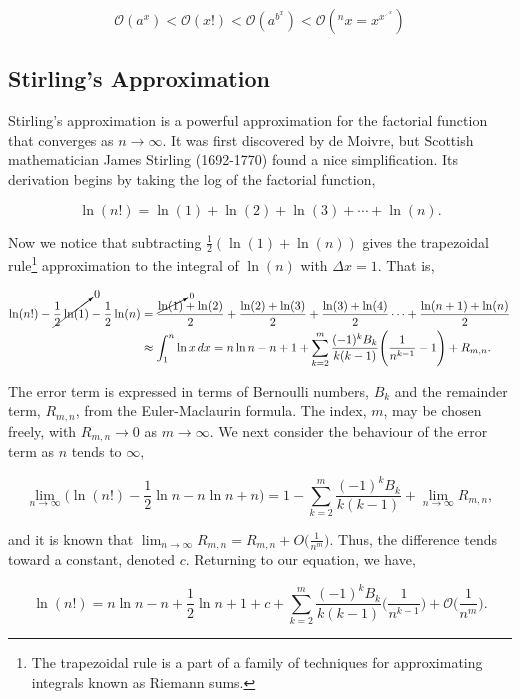 \documentclass[11pt]{amsart}
\begin{document}
$$\mathcal{O}(a^x) < \mathcal{O}(x!) < \mathcal{O}(a^{b^x}) < \mathcal{O}(^nx = x^{x^{\iddots^{x}}})$$

\subsection{Stirling's Approximation}

Stirling's approximation is a powerful approximation for the factorial function that converges as $n \to \infty$. It was first discovered by de Moivre, but Scottish mathematician James Stirling (1692-1770) found a nice simplification. Its derivation begins by taking the log of the factorial function,

$$\ln(n!) = \ln(1) + \ln(2) + \ln(3) + \cdots + \ln(n).$$

Now we notice that subtracting $\frac{1}{2}(\ln(1) + \ln(n))$ gives the trapezoidal rule\footnote{The trapezoidal rule is a part of a family of techniques for approximating integrals known as Riemann sums.} approximation to the integral of $\ln(n)$ with $\Delta x = 1$. That is,

\begin{align}
\ln(n!) - \cancelto{0}{\frac{1}{2}\ln(1)} - \frac{1}{2}\ln(n) &= \frac{\cancelto{0}{\ln(1)} + \ln(2)}{2} + \frac{\ln(2) + \ln(3)}{2} + \frac{\ln(3) + \ln(4)}{2} \cdots + \frac{\ln(n + 1) + \ln(n)}{2} \notag \\
&\approx \int_{1}^{n} \ln{x} \mathop{dx} = n\ln n - n + 1 + \sum_{k=2}^{m} \frac{(-1)^kB_k}{k(k-1)}\Bigg(\frac{1}{n^{k-1}} - 1\Bigg) + R_{m,n}. \notag
\end{align}

The error term is expressed in terms of Bernoulli numbers, $B_k$ and the remainder term, $R_{m,n}$, from the Euler-Maclaurin formula. The index, $m$, may be chosen freely, with $R_{m, n} \to 0$ as $m \to \infty$. We next consider the behaviour of the error term as $n$ tends to $\infty$,

$$\lim_{n \to \infty}\Big(\ln(n!) - \frac{1}{2}\ln n - n\ln n + n\Big) = 1 - \sum_{k=2}^{m} \frac{(-1)^kB_k}{k(k-1)} + \lim_{n \to \infty}R_{m,n},$$

and it is known that $\lim_{n \to \infty}R_{m,n} = R_{m,n} + O\Big(\frac{1}{n^m}\Big)$. Thus, the difference tends toward a constant, denoted $c$. Returning to our equation, we have,

$$\ln(n!) = n\ln n - n + \frac{1}{2}\ln n + 1 + c + \sum_{k=2}^{m} \frac{(-1)^kB_k}{k(k-1)}\Bigg(\frac{1}{n^{k-1}}\Bigg) + \mathcal{O}\Bigg(\frac{1}{n^m}\Bigg).$$
\end{document}
